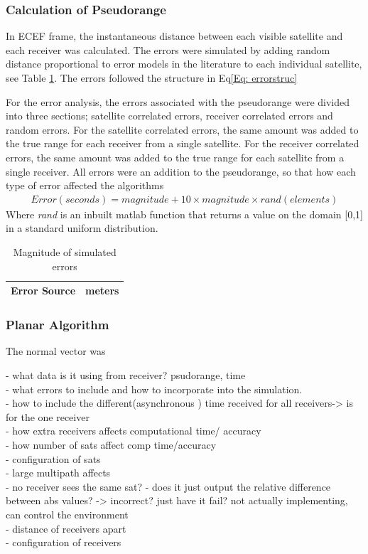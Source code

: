 \subsubsection{Calculation of Pseudorange}
In ECEF frame, the instantaneous distance between each visible satellite and each receiver was calculated. The errors were simulated by adding random distance proportional to error models in the literature to each individual satellite, see Table \ref{Table:mag errors}. The errors followed the structure in Eq\eqref{Eq: errorstruc}

For the error analysis, the errors associated with the pseudorange were divided into three sections; satellite correlated errors, receiver correlated errors and random errors. For the satellite correlated errors, the same amount was added to the true range for each receiver from a single satellite. For the receiver correlated errors, the same amount was added to the true range for each satellite from a single receiver.  
All errors were an addition to the pseudorange, so that how each type of error affected the algorithms 
\begin{eqnarray}
Error(seconds) = magnitude + 10\times magnitude\times rand(elements) \label{Eq: errorstruc}
\end{eqnarray}
Where \textit{rand} is an inbuilt matlab function that returns a value on the domain [0,1] in a standard uniform distribution.

\begin{table}
\centering
\caption{Magnitude of simulated errors}
\label{Table:mag errors}
\begin{tabular}{|c|c|}
\hline
Error Source & meters \\\hline
\end{tabular}
\end{table}



\subsubsection{Planar Algorithm}
The normal vector was


- what data is it using from receiver? psudorange, time\\

- what errors to include and how to incorporate into the simulation.\\
- how to include the different(asynchronous ) time received for all receivers-> is for the one receiver \\
- how extra receivers affects computational time/ accuracy\\
- how number of sats affect comp time/accuracy\\
- configuration of sats\\
- large multipath affects\\
- no receiver sees the same sat? - does it just output the relative difference between abs values? -> incorrect? just have it fail? not actually implementing, can control the environment\\
- distance of receivers apart\\
- configuration of receivers


